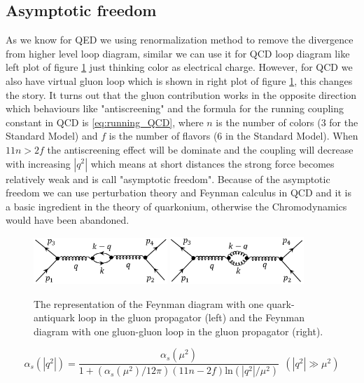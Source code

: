 \subsection{Asymptotic freedom}\label{subsec:asymptotic_freedom}
As we know for QED we using renormalization method to remove the divergence from higher level loop diagram, similar we can use it for QCD loop diagram like left plot of figure \ref{fig:QCD_loop} just thinking color as electrical charge. However, for QCD we also have virtual gluon loop which is shown in right plot of figure \ref{fig:QCD_loop}, this changes the story. It turns out that the gluon contribution works in the opposite direction which behaviours like "antiscreening" and the formula for the running coupling constant in QCD is \ref{eq:running_QCD}, where $n$ is the number of colors (3 for the Standard Model) and $f$ is the number of flavors (6 in the Standard Model). When $11n>2f$ the antiscreening effect will be dominate and the coupling will decrease with increasing $|q^{2}|$ which means at short distances the strong force becomes relatively weak and is call "asymptotic freedom". Because of the asymptotic freedom we can use perturbation theory and Feynman calculus in QCD and it is a basic ingredient in the theory of quarkonium, otherwise the Chromodynamics would have been abandoned.

\begin{figure}[h!]
 \begin{center}
\includegraphics[width=0.45\textwidth]{figures/theory/QCD_quark_loop.png}
\includegraphics[width=0.45\textwidth]{figures/theory/QCD_gluon_loop.png}
\caption{The representation of the Feynman diagram with one quark-antiquark loop in the gluon propagator (left) and the Feynman diagram with one gluon-gluon loop in the gluon propagator (right).}
  \label{fig:QCD_loop}
 \end{center}
\end{figure}

\begin{equation}
\alpha_{s}(|q^{2}|)=\frac{\alpha_{s}(\mu^{2})}{1+(\alpha_{s}(\mu^{2})/12\pi)(11n-2f)\mathrm{ln}(|q^{2}|/\mu^{2})}~~(|q^{2}|\gg\mu^{2})
\label{eq:running_QCD}
\end{equation}

